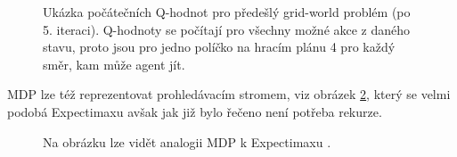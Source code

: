 \begin{figure}[!htbp]
\begin{center}
	\caption{Ukázka počátečních Q-hodnot pro předešlý grid-world problém (po 5. iteraci). Q-hodnoty se počítají pro všechny možné akce z daného stavu, proto jsou pro jedno políčko na hracím plánu 4 pro každý směr, kam může agent jít.}
	\label{img:qvals}
\end{center}
\end{figure}
MDP lze též reprezentovat prohledávacím stromem, viz obrázek \ref{img:mdptree}, který se velmi podobá Expectimaxu avšak jak již bylo řečeno není potřeba rekurze.

\begin{figure}[!htbp]
\begin{center}
	\caption{Na obrázku lze vidět analogii MDP k Expectimaxu \cite{RLIntro}.}
	\label{img:mdptree}
\end{center}
\end{figure}
\newpage
